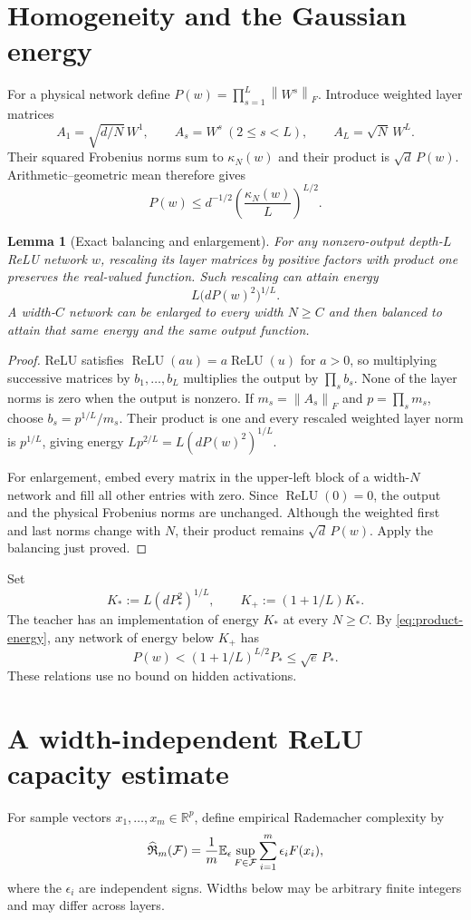 \documentclass[11pt]{article}
\newtheorem{lemma}[theorem]{Lemma}
\theoremstyle{remark}\newtheorem{remark}[theorem]{Remark}
\newcommand{\R}{\mathbb R}\newcommand{\E}{\mathbb E}\newcommand{\Prb}{\mathbb P}
\newcommand{\relu}{\operatorname{ReLU}}
\newcommand{\norm}[1]{\left\lVert#1\right\rVert}
\begin{document}
\section{Homogeneity and the Gaussian energy}
For a physical network define $P(w)=\prod_{s=1}^L\norm{W^s}_F$. Introduce weighted layer matrices
\[
 A_1=\sqrt{d/N}\,W^1,\qquad A_s=W^s\ (2\le s<L),\qquad A_L=\sqrt N\,W^L.
\]
Their squared Frobenius norms sum to $\kappa_N(w)$ and their product is $\sqrt d\,P(w)$. Arithmetic--geometric mean therefore gives
\begin{equation}\label{eq:product-energy}
 P(w)\le d^{-1/2}\left(\frac{\kappa_N(w)}L\right)^{L/2}.
\end{equation}

\begin{lemma}[Exact balancing and enlargement]
\label{lem:balance}
For any nonzero-output depth-$L$ ReLU network $w$, rescaling its layer matrices by positive factors with product one preserves the real-valued function. Such rescaling can attain energy
\[
 L\bigl(dP(w)^2\bigr)^{1/L}.
\]
A width-$C$ network can be enlarged to every width $N\ge C$ and then balanced to attain that same energy and the same output function.
\end{lemma}
\begin{proof}
ReLU satisfies $\relu(au)=a\relu(u)$ for $a>0$, so multiplying successive matrices by $b_1,\ldots,b_L$ multiplies the output by $\prod_s b_s$. None of the layer norms is zero when the output is nonzero. If $m_s=\norm{A_s}_F$ and $p=\prod_s m_s$, choose $b_s=p^{1/L}/m_s$. Their product is one and every rescaled weighted layer norm is $p^{1/L}$, giving energy $Lp^{2/L}=L(dP(w)^2)^{1/L}$.

For enlargement, embed every matrix in the upper-left block of a width-$N$ network and fill all other entries with zero. Since $\relu(0)=0$, the output and the physical Frobenius norms are unchanged. Although the weighted first and last norms change with $N$, their product remains $\sqrt d\,P(w)$. Apply the balancing just proved.
\end{proof}

Set
\[
 K_*:=L(dP_*^2)^{1/L},\qquad K_+:=(1+1/L)K_*.
\]
The teacher has an implementation of energy $K_*$ at every $N\ge C$. By \eqref{eq:product-energy}, any network of energy below $K_+$ has
\[
 P(w)<(1+1/L)^{L/2}P_*\le\sqrt e\,P_*.
\]
These relations use no bound on hidden activations.

\section{A width-independent ReLU capacity estimate}
For sample vectors $x_1,\ldots,x_m\in\R^p$, define empirical Rademacher complexity by
\[
 \Rad_m(\cF)=\frac1m\E_\epsilon\sup_{F\in\cF}\sum_{i=1}^m\epsilon_iF(x_i),
\]
where the $\epsilon_i$ are independent signs. Widths below may be arbitrary finite integers and may differ across layers.
\end{document}
